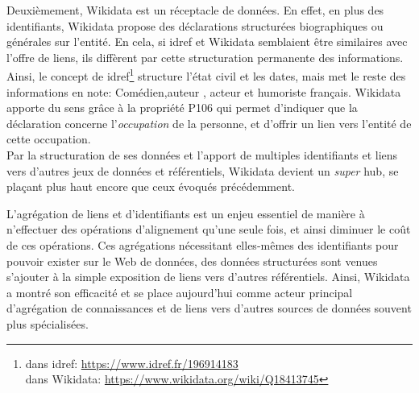 Deuxièmement, Wikidata est un réceptacle de données. En effet, en plus des identifiants, Wikidata propose des déclarations structurées biographiques ou générales sur l'entité. En cela, si \ac{idref} et Wikidata semblaient être similaires avec l'offre de liens, ils diffèrent par cette structuration permanente des informations. Ainsi,  le concept  de \ac{idref}\footnote{ dans \ac{idref}: \url{https://www.idref.fr/196914183}\\ dans Wikidata: \url{https://www.wikidata.org/wiki/Q18413745}} structure l'état civil et les dates, mais met le reste des informations en note: \og Comédien,auteur , acteur et humoriste français\fg{}. Wikidata apporte du sens grâce à la propriété P106 qui permet d'indiquer que la déclaration concerne l'\textit{occupation} de la personne, et d'offrir un lien vers l'entité de cette occupation.\\

Par la structuration de ses données et l'apport de multiples identifiants et liens vers d'autres jeux de données et référentiels, Wikidata devient un \textit{super} hub, se plaçant plus haut encore que ceux évoqués précédemment.

\bigskip
\bigskip
L'agrégation de liens et d'identifiants est un enjeu essentiel de manière à n'effectuer des opérations d'alignement qu'une seule fois, et ainsi diminuer le coût de ces opérations. Ces agrégations nécessitant elles-mêmes des identifiants pour pouvoir exister sur le Web de données, des données structurées sont venues s'ajouter à la simple exposition de liens vers d'autres référentiels. Ainsi, Wikidata a montré son efficacité et se place aujourd'hui comme acteur principal d'agrégation de connaissances et de liens vers d'autres sources de données souvent plus spécialisées.